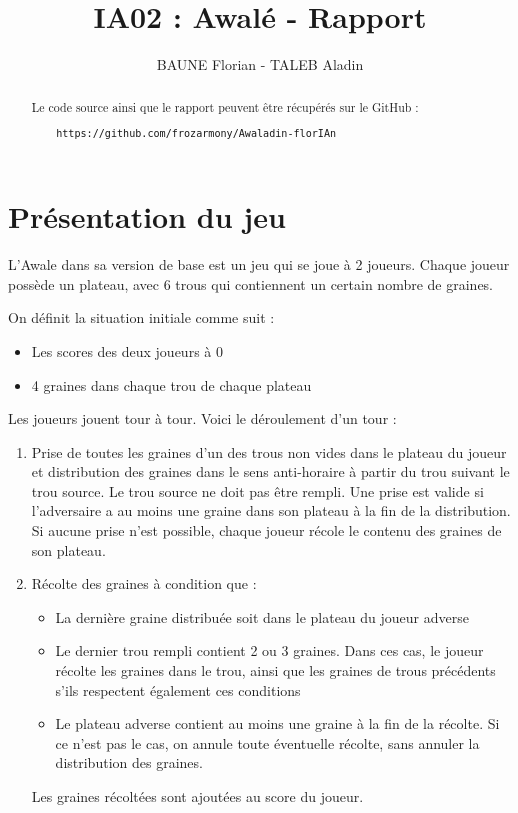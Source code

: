 \documentclass[]{article}
\title{IA02 : Awalé - Rapport}
\author{BAUNE Florian - TALEB Aladin}
\date{}
\begin{document}
\maketitle

\begin{abstract}
	Le code source ainsi que le rapport peuvent être récupérés sur le GitHub :
	\begin{verbatim}
	https://github.com/frozarmony/Awaladin-florIAn
	\end{verbatim}
\end{abstract}

\section{Présentation du jeu}

L'Awale dans sa version de base est un jeu qui se joue à 2 joueurs. Chaque joueur possède un plateau, avec 6 trous qui contiennent un certain nombre de graines.

On définit la situation initiale comme suit : 
\begin{itemize}
\item Les scores des deux joueurs à 0
\item 4 graines dans chaque trou de chaque plateau
\end{itemize}

Les joueurs jouent tour à tour. Voici le déroulement d'un tour : 

\begin{enumerate}
\item Prise de toutes les graines d'un des trous non vides dans le plateau du joueur et distribution des graines dans le sens anti-horaire à partir du trou suivant le trou source. Le trou source ne doit pas être rempli.
\subitem Une prise est valide si l'adversaire a au moins une graine dans son plateau à la fin de la distribution. Si aucune prise n'est possible, chaque joueur récole le contenu des graines de son plateau.
\item Récolte des graines à condition que :
	\begin{itemize}
	\item La dernière graine distribuée soit dans le plateau du joueur adverse
	\item Le dernier trou rempli contient 2 ou 3 graines. 
	\subitem Dans ces cas, le joueur récolte les graines dans le trou, ainsi que les graines de trous précédents s'ils respectent également ces conditions
	\item Le plateau adverse contient au moins une graine à la fin de la récolte. Si ce n'est pas le cas, on annule toute éventuelle récolte, sans annuler la distribution des graines.
	\end{itemize}
	\subitem Les graines récoltées sont ajoutées au score du joueur.
\end{enumerate}
\end{document}
